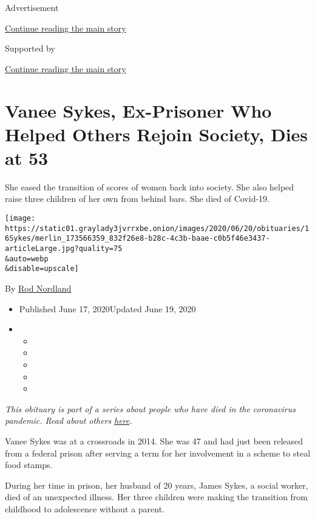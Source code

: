 Advertisement

\protect\hyperlink{after-top}{Continue reading the main story}

Supported by

\protect\hyperlink{after-sponsor}{Continue reading the main story}

\hypertarget{vanee-sykes-ex-prisoner-who-helped-others-rejoin-society-dies-at-53}{%
\section{Vanee Sykes, Ex-Prisoner Who Helped Others Rejoin Society, Dies
at
53}\label{vanee-sykes-ex-prisoner-who-helped-others-rejoin-society-dies-at-53}}

She eased the transition of scores of women back into society. She also
helped raise three children of her own from behind bars. She died of
Covid-19.

\texttt{[image: https://static01.graylady3jvrrxbe.onion/images/2020/06/20/obituaries/16Sykes/merlin\_173566359\_832f26e8-b28c-4c3b-baae-c0b5f46e3437-articleLarge.jpg?quality=75\\\&auto=webp\\\&disable=upscale]}

By \href{https://www.nytimes3xbfgragh.onion/by/rod-nordland}{Rod
Nordland}

\begin{itemize}
\item
  Published June 17, 2020Updated June 19, 2020
\item
  \begin{itemize}
  \item
  \item
  \item
  \item
  \item
  \end{itemize}
\end{itemize}

\emph{This obituary is part of a series about people who have died in
the coronavirus pandemic. Read about others}
\href{https://www.nytimes3xbfgragh.onion/interactive/2020/obituaries/people-died-coronavirus-obituaries.html}{\emph{here}}\emph{.}

Vanee Sykes was at a crossroads in 2014. She was 47 and had just been
released from a federal prison after serving a term for her involvement
in a scheme to steal food stamps.

During her time in prison, her husband of 20 years, James Sykes, a
social worker, died of an unexpected illness. Her three children were
making the transition from childhood to adolescence without a parent.

